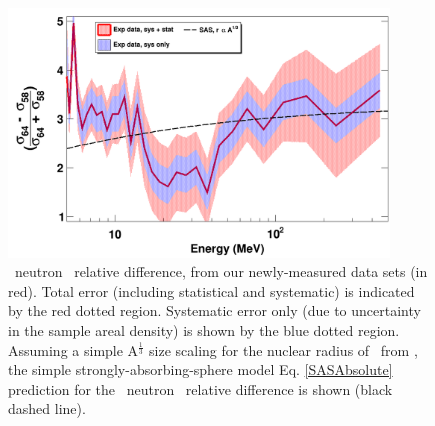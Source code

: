 \begin{figure}[ht!]
    \centering
    \includegraphics[width=0.9\textwidth]{figures/relativeDiff_Ni64Ni58.png}
    \caption[\niEightFour\ neutron \tot\ relative difference]
    {
        \niEightFour\ neutron \tot\ relative difference, from our newly-measured
        data sets (in red). Total error (including statistical and systematic)
        is indicated by the red dotted region. Systematic error only (due to
        uncertainty in the sample areal density) is shown by the blue dotted region.   
        Assuming a simple A$^{\frac{1}{3}}$ size scaling for the
        nuclear radius of \niFour\ from \niEight, the simple
        strongly-absorbing-sphere model Eq. \ref{SASAbsolute} prediction
        for the \niEightFour\ neutron \tot\ relative
        difference is shown (black dashed line).
    }
    \label{IsotopicDifferenceNi}
\end{figure}

